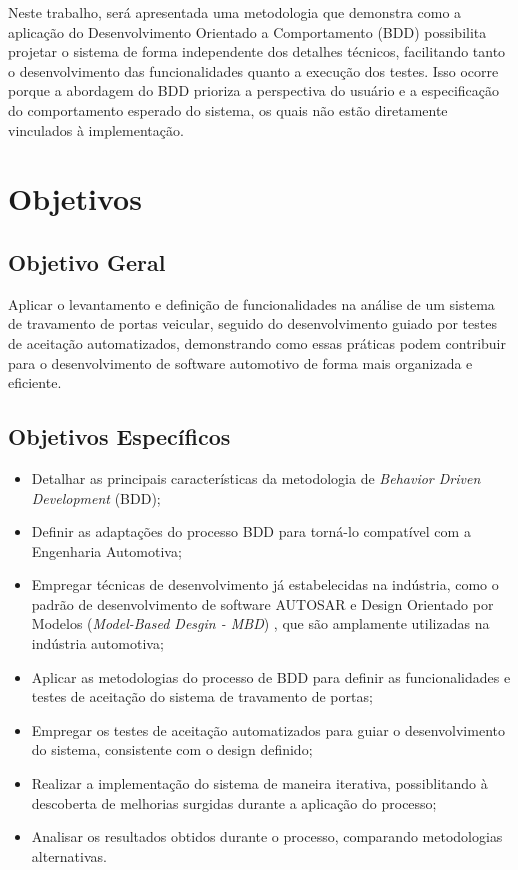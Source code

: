 Neste trabalho, será apresentada uma metodologia que demonstra como a aplicação do Desenvolvimento Orientado a Comportamento (BDD) possibilita projetar o 
sistema de forma independente dos detalhes técnicos, facilitando tanto o desenvolvimento das funcionalidades quanto a execução dos testes. Isso ocorre 
porque a abordagem do BDD prioriza a perspectiva do usuário e a especificação do comportamento esperado do sistema, os quais não estão diretamente vinculados 
à implementação.

\section{\textbf{Objetivos}}

\subsection{Objetivo Geral}
Aplicar o levantamento e definição de funcionalidades na análise de um sistema de travamento de portas veicular, seguido do desenvolvimento guiado por testes de 
aceitação automatizados, demonstrando como essas práticas podem contribuir para o desenvolvimento de software automotivo de forma mais organizada e eficiente.

\subsection{Objetivos Específicos}
\begin{itemize}
	\item Detalhar as principais características da metodologia de \textit{Behavior Driven Development} (BDD);
    \item Definir as adaptações do processo BDD para torná-lo compatível com a Engenharia Automotiva;
    \item Empregar técnicas de desenvolvimento já estabelecidas na indústria, como o padrão de desenvolvimento de software AUTOSAR \cite{autosarClassic} e Design Orientado por Modelos (\textit{Model-Based Desgin - MBD}) \cite{mathworksMBD2024}, que são amplamente utilizadas na indústria automotiva;
    \item Aplicar as metodologias do processo de BDD para definir as funcionalidades e testes de aceitação do sistema de travamento de portas;
    \item Empregar os testes de aceitação automatizados para guiar o desenvolvimento do sistema, consistente com o design definido;
    \item Realizar a implementação do sistema de maneira iterativa, possiblitando à descoberta de melhorias surgidas durante a aplicação do processo;
    \item Analisar os resultados obtidos durante o processo, comparando metodologias alternativas.
\end{itemize}

